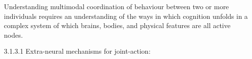           Understanding multimodal coordination of behaviour between two or more individuals requires an understanding of the ways in which cognition unfolds in a complex system of which brains, bodies, and physical features are all active nodes.










        3.1.3.1 Extra-neural mechanisms for joint-action:


